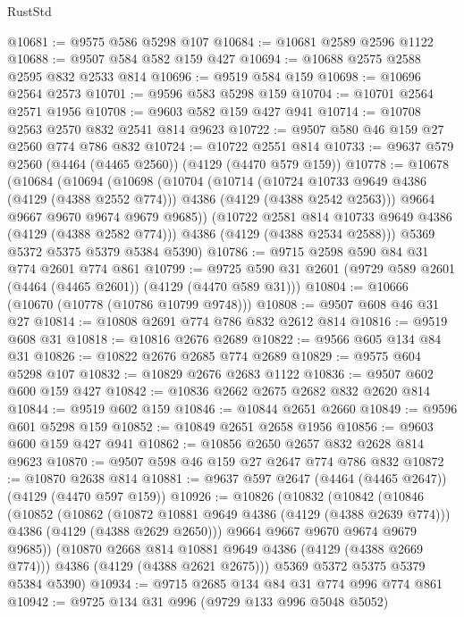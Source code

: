 \begin{lexlean}{RustStd}
\begin{coremodule}
@10681 := @9575 @586 @5298 @107
@10684 := @10681 @2589 @2596 @1122
@10688 := @9507 @584 @582 @159 @427
@10694 := @10688 @2575 @2588 @2595 @832 @2533 @814
@10696 := @9519 @584 @159
@10698 := @10696 @2564 @2573
@10701 := @9596 @583 @5298 @159
@10704 := @10701 @2564 @2571 @1956
@10708 := @9603 @582 @159 @427 @941
@10714 := @10708 @2563 @2570 @832 @2541 @814 @9623
@10722 := @9507 @580 @46 @159 @27 @2560 @774 @786 @832
@10724 := @10722 @2551 @814
@10733 := @9637 @579 @2560 (@4464 (@4465 @2560)) (@4129 (@4470 @579 @159))
@10778 := @10678
    (@10684
      (@10694
        (@10698
          (@10704
            (@10714
              (@10724 @10733 @9649 @4386 (@4129 (@4388 @2552 @774)))
              @4386
              (@4129 (@4388 @2542 @2563)))
            @9664
            @9667
            @9670
            @9674
            @9679
            @9685))
        (@10722 @2581 @814 @10733 @9649 @4386 (@4129 (@4388 @2582 @774)))
        @4386
        (@4129 (@4388 @2534 @2588)))
      @5369
      @5372
      @5375
      @5379
      @5384
      @5390)
@10786 := @9715 @2598 @590 @84 @31 @774 @2601 @774 @861
@10799 := @9725 @590 @31 @2601 (@9729 @589 @2601 (@4464 (@4465 @2601)) (@4129 (@4470 @589 @31)))
@10804 := @10666 (@10670 (@10778 (@10786 @10799 @9748)))
@10808 := @9507 @608 @46 @31 @27
@10814 := @10808 @2691 @774 @786 @832 @2612 @814
@10816 := @9519 @608 @31
@10818 := @10816 @2676 @2689
@10822 := @9566 @605 @134 @84 @31
@10826 := @10822 @2676 @2685 @774 @2689
@10829 := @9575 @604 @5298 @107
@10832 := @10829 @2676 @2683 @1122
@10836 := @9507 @602 @600 @159 @427
@10842 := @10836 @2662 @2675 @2682 @832 @2620 @814
@10844 := @9519 @602 @159
@10846 := @10844 @2651 @2660
@10849 := @9596 @601 @5298 @159
@10852 := @10849 @2651 @2658 @1956
@10856 := @9603 @600 @159 @427 @941
@10862 := @10856 @2650 @2657 @832 @2628 @814 @9623
@10870 := @9507 @598 @46 @159 @27 @2647 @774 @786 @832
@10872 := @10870 @2638 @814
@10881 := @9637 @597 @2647 (@4464 (@4465 @2647)) (@4129 (@4470 @597 @159))
@10926 := @10826
    (@10832
      (@10842
        (@10846
          (@10852
            (@10862
              (@10872 @10881 @9649 @4386 (@4129 (@4388 @2639 @774)))
              @4386
              (@4129 (@4388 @2629 @2650)))
            @9664
            @9667
            @9670
            @9674
            @9679
            @9685))
        (@10870 @2668 @814 @10881 @9649 @4386 (@4129 (@4388 @2669 @774)))
        @4386
        (@4129 (@4388 @2621 @2675)))
      @5369
      @5372
      @5375
      @5379
      @5384
      @5390)
@10934 := @9715 @2685 @134 @84 @31 @774 @996 @774 @861
@10942 := @9725 @134 @31 @996 (@9729 @133 @996 @5048 @5052)

\end{coremodule}
\end{lexlean}

